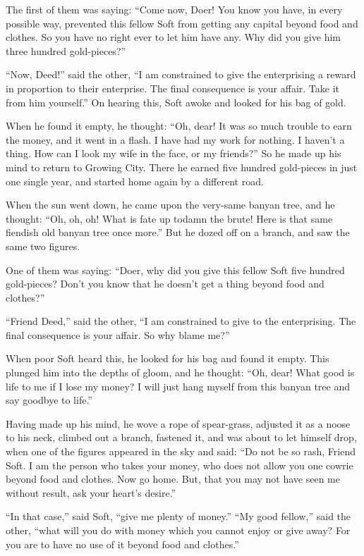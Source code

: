 \documentclass[article, twoside, 14pt]{memoir}
\begin{document}
The first of them was saying:
``Come now, Doer! You know you have, in every possible way, prevented this fellow Soft from getting any capital beyond food and clothes. So you have no right ever to let him have any. Why did you give him three hundred gold-pieces?''

``Now, Deed!'' said the other,
``I am constrained to give the enterprising a reward in proportion to their enterprise. The final consequence is your affair. Take it from him yourself.''
On hearing this, Soft awoke and looked for his bag of gold.

When he found it empty, he thought:
``Oh, dear! It was so much trouble to earn the money, and it went in a flash. I have had my work for nothing. I haven't a thing. How can I look my wife in the face, or my friends?''
So he made up his mind to return to Growing City. There he earned
five hundred gold-pieces in just one single year, and started home
again by a different road.

When the sun went down, he came upon the very-same banyan tree, and
he thought:
``Oh, oh, oh! What is fate up to{\textemdash}damn the brute! Here is that same fiendish old banyan tree once more.''
But he dozed off on a branch, and saw the same two figures.

One of them was saying:
``Doer, why did you give this fellow Soft five hundred gold-pieces? Don't you know that he doesn't get a thing beyond food and clothes?''

``Friend Deed,'' said the other,
``I am constrained to give to the enterprising. The final consequence is your affair. So why blame me?''

When poor Soft heard this, he looked for his bag and found it
empty. This plunged him into the depths of gloom, and he thought:
``Oh, dear! What good is life to me if I lose my money? I will just hang myself from this banyan tree and say goodbye to life.''

Having made up his mind, he wove a rope of spear-grass, adjusted it
as a noose to his neck, climbed out a branch, fastened it, and was
about to let himself drop, when one of the figures appeared in the
sky and said:
``Do not be so rash, Friend Soft. I am the person who takes your money, who does not allow you one cowrie beyond food and clothes. Now go home. But, that you may not have seen me without result, ask your heart's desire.''

``In that case,'' said Soft, ``give me plenty of money.''
``My good fellow,'' said the other,
``what will you do with money which you cannot enjoy or give away? For you are to have no use of it beyond food and clothes.''
\end{document}
